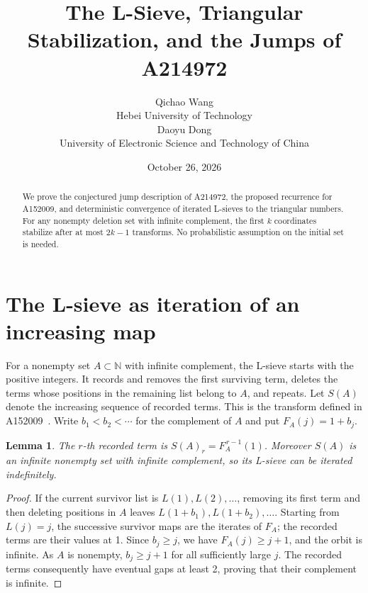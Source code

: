 \documentclass[10pt]{article}
\title{The L-Sieve, Triangular Stabilization, and the Jumps of A214972}
\author{Qichao Wang\\{\small Hebei University of Technology}\\[0.3em]
Daoyu Dong\\{\small University of Electronic Science and Technology of China}}
\date{October 26, 2026}
\newtheorem{lemma}{Lemma}
\begin{document}
\maketitle
\begin{abstract}
We prove the conjectured jump description of A214972, the proposed recurrence
for A152009, and deterministic convergence of iterated L-sieves to the triangular
numbers. For any nonempty deletion set with infinite complement, the first $k$
coordinates stabilize after at most $2k-1$ transforms. No probabilistic assumption
on the initial set is needed.
\end{abstract}

\section{The L-sieve as iteration of an increasing map}
For a nonempty set $A\subset\mathbb N$ with infinite complement, the L-sieve
starts with the positive integers. It records and removes the first surviving
term, deletes the terms whose positions in the remaining list belong to $A$,
and repeats. Let $S(A)$ denote the increasing sequence of recorded terms.
This is the transform defined in A152009~\cite{oeis152}.
Write $b_1<b_2<\cdots$ for the complement of $A$ and put $F_A(j)=1+b_j$.

\begin{lemma}\label{lem:iteration}
The $r$-th recorded term is $S(A)_r=F_A^{\,r-1}(1)$.
Moreover $S(A)$ is an infinite nonempty set with infinite complement, so its
L-sieve can be iterated indefinitely.
\end{lemma}
\begin{proof}
If the current survivor list is $L(1),L(2),\ldots$, removing its first term and
then deleting positions in $A$ leaves $L(1+b_1),L(1+b_2),\ldots$.
Starting from $L(j)=j$, the successive survivor maps are the iterates of $F_A$;
the recorded terms are their values at 1. Since $b_j\ge j$, we have
$F_A(j)\ge j+1$, and the orbit is infinite. As $A$ is nonempty, $b_j\ge j+1$
for all sufficiently large $j$. The recorded terms consequently have eventual
gaps at least 2, proving that their complement is infinite.
\end{proof}
\end{document}
